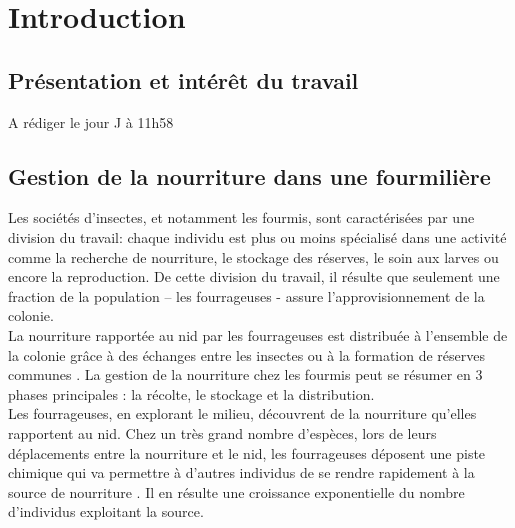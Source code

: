\chapter{Introduction}

\section{Présentation et intérêt du travail}
A rédiger le jour J à 11h58


\section{Gestion de la nourriture dans une fourmilière}

Les sociétés d'insectes, et notamment les fourmis, sont caractérisées par une division du travail: chaque individu est plus ou moins spécialisé dans une activité comme la recherche de nourriture, le stockage des réserves, le soin aux larves ou encore la reproduction. De cette division du travail, il résulte que seulement une fraction de la population – les fourrageuses - assure l'approvisionnement de la colonie.\\

La nourriture rapportée au nid par les fourrageuses est distribuée à l'ensemble de la colonie grâce à des échanges entre les insectes ou à la formation de réserves communes \citep{holldobler_ants_1990,passera_les_2005}. La gestion de la nourriture chez les fourmis peut se résumer en 3 phases principales : la récolte, le stockage et la distribution.\\

Les fourrageuses, en explorant le milieu, découvrent de la nourriture qu'elles rapportent au nid. Chez un très grand nombre d'espèces, lors de leurs déplacements entre la nourriture et le nid, les fourrageuses déposent une piste chimique qui va permettre à d'autres individus de se rendre rapidement à la source de nourriture \citep{camazine_self-organization_2003}. Il en résulte une croissance exponentielle du nombre d'individus exploitant la source.\\

